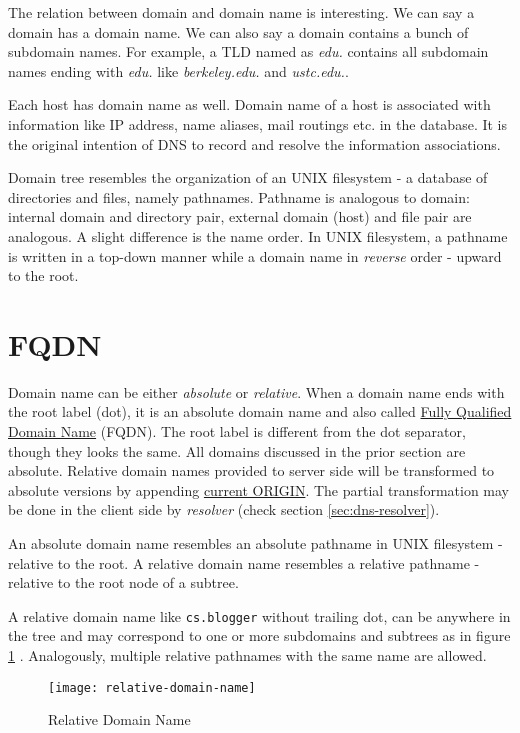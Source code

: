 The relation between domain and domain name is interesting. We can
say a domain has a domain name. We can also say a domain contains
a bunch of subdomain names. For example, a TLD named as
\textit{edu.} contains all subdomain names ending with
\textit{edu.} like \textit{berkeley.edu.} and \textit{ustc.edu.}.

Each host has domain name as well. Domain name of a host is
associated with information like IP address, name aliases, mail
routings etc. in the database. It is the original intention of DNS
to record and resolve the information associations.

Domain tree resembles the organization of an UNIX filesystem - a
database of directories and files, namely pathnames. Pathname is
analogous to domain: internal domain and directory pair, external
domain (host) and file pair are analogous. A slight difference is
the name order. In UNIX filesystem, a pathname is written in a
top-down manner while a domain name in \textit{reverse} order -
upward to the root.

\section{FQDN}
\label{sec:fqdn}

Domain name can be either \textit{absolute} or
\textit{relative}. When a domain name ends with the root label
(dot), it is an absolute domain name and also called \uline{Fully
  Qualified Domain Name} (FQDN). The root label is different from
the dot separator, though they looks the same. All domains
discussed in the prior section are absolute. Relative domain names
provided to server side will be transformed to absolute versions
by appending
\href{http://www.zytrax.com/books/dns/ch8/origin.html}{current
  ORIGIN}. The partial transformation may be done in the client
side by \textit{resolver} (check section \ref{sec:dns-resolver}).

An absolute domain name resembles an absolute pathname in UNIX
filesystem - relative to the root. A relative domain name
resembles a relative pathname - relative to the root node of a
subtree.

A relative domain name like \verb|cs.blogger| without trailing
dot, can be anywhere in the tree and may correspond to one or more
subdomains and subtrees as in figure
\ref{fig:relative-domain-name} . Analogously, multiple relative
pathnames with the same name are allowed.

\begin{figure}
  \centering
  \texttt{[image: relative-domain-name]}
  \caption{Relative Domain Name}
  \label{fig:relative-domain-name}
\end{figure}

